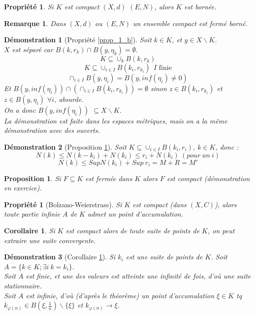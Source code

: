 \documentclass[a4paper, oneside]{report}
\theoremstyle{break}
\newtheorem{propr}[thm]{Propriété}
\newtheorem{propo}[thm]{Proposition}
\newtheorem{cor}[thm]{Corollaire}
\newtheorem*{demo}{Démonstration}
\newtheorem{remar}[thm]{Remarque}
\newcommand{\fracun}[1]{\frac{1}{#1}}
\begin{document}
\begin{propr}
\label{prop_2_b}
Si $K$ est compact $(X,d)$ $(E,N)$, alors $K$ est bornée.
\end{propr}

\begin{remar}
Dans $(X,d)$ ou $(E,N)$ un ensemble compact est fermé borné.\\
\end{remar}

\begin{demo}[Propriété \ref{prop_1_b}]
Soit $k\in K$, et $y\in X\backslash K$.\\
$X$ est séparé car $B(k,r_k)\cap B(y,\eta_k)=\emptyset$.\\
$$K\subseteq \cup_k B(k,r_k)$$
$$K\subseteq \cup_{i\in I} B(k_i,r_{k_i}) ~~I\text{ finie}$$
$$\cap_{i\in I} B(y,\eta_i)=B(y,inf(\eta_i)\neq 0)$$
Et $B(y,inf(\eta_i))\cap (\cap_{i\in I} B(k_i,r_{k_i})) = \emptyset$ sinon $z\in B(k_i,r_{k_i})$ et $z\in B(y,\eta_i)$ $\forall i$, absurde.\\
On a donc $B(y,inf(\eta_i))$ $\subseteq X\backslash K$.\\
La démonstration est faite dans les espaces métriques, mais on a la même démonstration avec des ouverts.
\end{demo}

\begin{demo}[Proposition \ref{prop_2_b}]
Soit $K\subseteq \cup_{i\in I} B(k_i,r_i)$, $k\in K$, donc :
$$N(k) \leq N(k-k_i)+N(k_i) \leq r_i+N(k_i)~(pour~un~i)$$
$$N(k) \leq Sup N(k_i) + Sup~r_i = M+R=M'$$
\end{demo}


\begin{propo}
Si $F \subseteq K$ est fermée dans $K$ alors $F$ est compact (démonstration en exercice).
\end{propo}

\begin{propr}[Bolzano-Weierstrass]
\label{BW}
Si $K$ est compact (dans $(X,C)$), alors toute partie infinie $A$ de $K$ admet un point d'accumulation.
\end{propr}


\begin{cor}
\label{cor_1}
Si $K$ est compact alors de toute suite de points de $K$, on peut extraire une suite convergente.
\end{cor}

\begin{demo}[Corollaire \ref{cor_1}]
Si $k_i$ est une suite de points de $K$. Soit $A=\{k\in K;\exists i~k=k_i \}$.\\
Soit $A$ est finie, et une des valeurs est atteinte une infinité de fois, d'où une suite stationnaire.\\
Soit $A$ est infinie, d'où (d'après le théorème) un point d'accumulation $\xi \in K$ tq $k_{\varphi(n)}\in B(\xi, \fracun{n})\backslash \{\xi\}$ et $k_{\varphi(n)} \rightarrow \xi$.\\
\end{demo}
\end{document}
